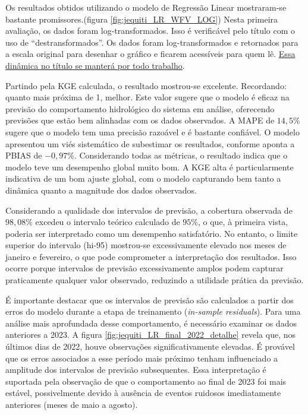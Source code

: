 Os resultados obtidos utilizando o modelo de Regressão Linear mostraram-se bastante promissores.(figura \ref{fig:jequiti_LR_WFV_LOG}) Nesta primeira avaliação, os dados foram log-transformados. Isso é verificável pelo título com o uso de ``destransformados''. Os dados foram log-transformados e retornados para a escala original para desenhar o gráfico e ficarem acessíveis para quem lê. \underline{Essa dinâmica no título se manterá por todo trabalho}.

Partindo pela KGE calculada, o resultado mostrou-se excelente. Recordando: quanto mais próxima de 1, melhor. Este valor sugere que o modelo é eficaz na previsão do comportamento hidrológico do sistema em análise, oferecendo previsões que estão bem alinhadas com os dados observados. A MAPE de $14,5\%$ sugere que o modelo tem uma precisão razoável e é bastante confiável. O modelo apresentou um viés sistemático de subestimar os resultados, conforme aponta a PBIAS de $-0,97\%$. Considerando todas as métricas, o resultado indica que o modelo teve um desempenho global muito bom. A KGE alta é particularmente indicativa de um bom ajuste global, com o modelo capturando bem tanto a dinâmica quanto a magnitude dos dados observados.

Considerando a qualidade dos intervalos de previsão, a cobertura observada de $98,08\%$ excedeu o intervalo teórico calculado de $95\%$, o que, à primeira vista, poderia ser interpretado como um desempenho satisfatório. No entanto, o limite superior do intervalo (hi-95) mostrou-se excessivamente elevado nos meses de janeiro e fevereiro, o que pode comprometer a interpretação dos resultados. Isso ocorre porque intervalos de previsão excessivamente amplos podem capturar praticamente qualquer valor observado, reduzindo a utilidade prática da previsão.

É importante destacar que os intervalos de previsão são calculados a partir dos erros do modelo durante a etapa de treinamento (\textit{in-sample residuals}). Para uma análise mais aprofundada desse comportamento, é necessário examinar os dados anteriores a 2023. A figura \ref{fig:jequiti_LR_final_2022_detalhe} revela que, nos últimos dias de 2022, houve observações significativamente elevadas. É provável que os erros associados a esse período mais próximo tenham influenciado a amplitude dos intervalos de previsão subsequentes. Essa interpretação é suportada pela observação de que o comportamento ao final de 2023 foi mais estável, possivelmente devido à ausência de eventos ruidosos imediatamente anteriores (meses de maio a agosto).

